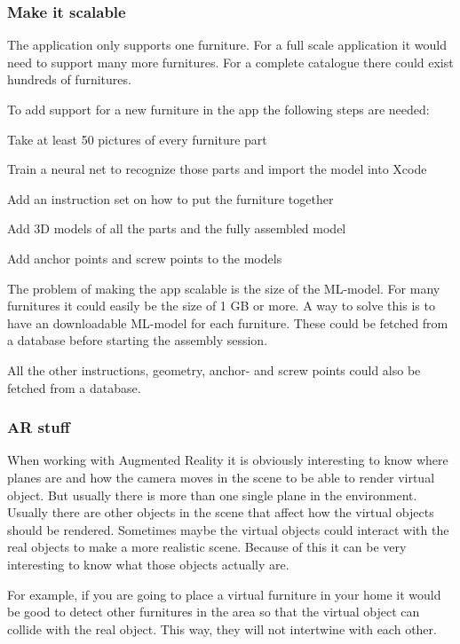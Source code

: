 \subsubsection{Make it scalable}
The application only supports one furniture. For a full scale application it would need to support
many more furnitures. For a complete catalogue there could exist hundreds of furnitures.

To add support for a new furniture in the app the following steps are needed:

\begin{list}{•}
\item Take at least 50 pictures of every furniture part
\item Train a neural net to recognize those parts and import the model into Xcode
\item Add an instruction set on how to put the furniture together
\item Add 3D models of all the parts and the fully assembled model
\item Add anchor points and screw points to the models
\end{list}

The problem of making the app scalable is the size of the ML-model. For many furnitures it could
easily be the size of 1 GB or more. A way to solve this is to have an downloadable ML-model for each 
furniture. These could be fetched from a database before starting the assembly session.

All the other instructions, geometry, anchor- and screw points could also be fetched from a database.

\subsubsection{AR stuff}
When working with Augmented Reality it is obviously interesting to know where planes are and how the 
camera moves in the scene to be able to render virtual object. But usually there is more than one single 
plane in the environment. Usually there are other objects in the scene that affect how the virtual objects 
should be rendered. Sometimes maybe the virtual objects could interact with the real objects to make a 
more realistic scene. Because of this it can be very interesting to know what those objects actually are.

For example, if you are going to place a virtual furniture in your home it would be good to detect other 
furnitures in the area so that the virtual object can collide with the real object. This way, they will not 
intertwine with each other.

